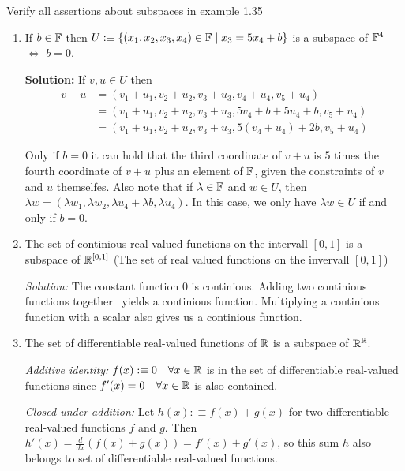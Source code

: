 \begin{xrcs}
  Verify all assertions about subspaces in example 1.35
\end{xrcs}
\begin{enumerate}
  \item {
    If $b \in \mathbb{F}$ then $U :\equiv \{(x_1, x_2, x_3, x_4) \in \mathbb{F} \mid x_3 = 5x_4+b \}$ is a subspace of $\mathbb{F}^4$ $\iff$ $b=0$.

    \textbf{Solution:} If $v,u \in U$ then
    \begin{equation}
      \begin{aligned}
        v+u & = (v_1+u_1, v_2+u_2, v_3+u_3, v_4+u_4, v_5+u_4) \\
        & = (v_1+u_1, v_2+u_2, v_3+u_3, 5v_4+b+5u_4+b, v_5+u_4) \\
        & = (v_1+u_1, v_2+u_2, v_3+u_3, 5(v_4 + u_4) + 2b, v_5+u_4)
      \end{aligned}
    \end{equation}

    Only if $b=0$ it can hold that the third coordinate of $v+u$ is $5$ times the fourth coordinate of $v+u$ plus an element of $\mathbb{F}$, given the constraints of $v$ and $u$ themselfes. Also note that if $\lambda \in \mathbb{F}$ and $w \in U$, then $\lambda w = (\lambda w_1, \lambda w_2, \lambda u_4 + \lambda b, \lambda u_4)$. In this case, we only have $\lambda w \in U$ if and only if $b=0$.
  }

  \item{
    The set of continious real-valued functions on the intervall $[0,1]$ is a subspace of $\mathbb{R}^{[0,1]}$ (The set of real valued functions on the invervall $[0,1]$)

    \emph{Solution:} The constant function $0$ is continious. Adding two continious functions together ~yields a continious function. Multiplying a continious function with a scalar also gives us a continious function.
  }

  \item{
    The set of differentiable real-valued functions of $\mathbb{R}$ is a subspace of $\mathbb{R}^{\mathbb{R}}$.

    \emph{Additive identity:} $f(x) :\equiv 0 \quad \forall x \in \mathbb{R}$ is in the set of differentiable real-valued functions since $f'(x) = 0 \quad \forall x \in \mathbb{R}$ is also contained.

    \emph{Closed under addition:} Let $h(x) :\equiv f(x) + g(x)$ for two differentiable real-valued functions $f$ and $g$. Then $h'(x) = \frac{d}{dx} (f(x)+g(x)) = f'(x) + g'(x)$, so this sum $h$ also belongs to set of differentiable real-valued functions.

}
\end{enumerate}
